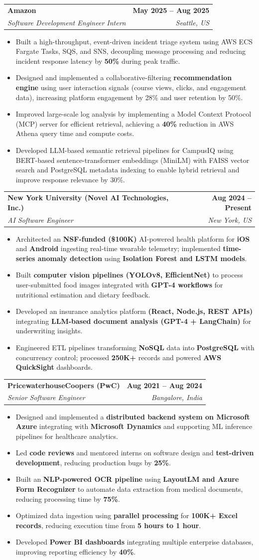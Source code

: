 \documentclass[letterpaper,11pt]{article}
\makeatletter
\newcommand{\resumeItem}[1]{
\item\footnotesize{{#1}\vspace{-4pt}}
}
\newcommand{\resumeSubheading}[4]{
\vspace{2pt}
\item
\begin{tabular*}{1.0\textwidth}[t]{l@{\extracolsep{\fill}}r}
\textbf{\small #1} & \textbf{\scriptsize #2} \\
\textit{\scriptsize #3} & \textit{\scriptsize #4} \\
\end{tabular*}\vspace{-7pt}
}
\newcommand{\resumeItemListStart}{\begin{itemize}[leftmargin=*, itemsep=0pt, topsep=0pt]}
\newcommand{\resumeItemListEnd}{\end{itemize}\vspace{-5pt}}
\makeatother
\begin{document}
\resumeSubheading
{Amazon}{May 2025 -- Aug 2025}
{Software Development Engineer Intern}{Seattle, US}
\resumeItemListStart
\resumeItem{Built a high-throughput, event-driven incident triage system using AWS ECS Fargate Tasks, SQS, and SNS, decoupling message processing and reducing incident response latency by \textbf{50\%} during peak traffic.}
\resumeItem{ Designed and implemented a collaborative-filtering \textbf{recommendation engine} using user interaction signals (course views, clicks, and engagement data), increasing platform engagement by 28\% and user retention by 50\%.}
\resumeItem{Improved large-scale log analysis by implementing a Model Context Protocol (MCP) server for efficient retrieval, achieving a \textbf{40\%} reduction in AWS Athena query time and compute costs.}
\resumeItem{Developed LLM-based semantic retrieval pipelines for CampusIQ using BERT-based sentence-transformer embeddings (MiniLM) with FAISS vector search and PostgreSQL metadata indexing to enable hybrid retrieval and improve response relevance by 30\%.}
\resumeItemListEnd

\resumeSubheading
{New York University (Novel AI Technologies, Inc.)
\href{https://mybeatshealth.com/home}{\faExternalLink}
\href{https://broker.mybeatshealth.com/}{\faExternalLink}}
{Aug 2024 -- Present}
{AI Software Engineer}{New York, US}
\resumeItemListStart
\resumeItem{Architected an \textbf{NSF-funded (\$100K)} AI-powered health platform for \textbf{iOS} and \textbf{Android} ingesting real-time wearable telemetry; implemented \textbf{time-series anomaly detection} using \textbf{Isolation Forest and LSTM models}.}
\resumeItem{Built \textbf{computer vision pipelines (YOLOv8, EfficientNet)} to process user-submitted food images integrated with \textbf{GPT-4 workflows} for nutritional estimation and dietary feedback.}
\resumeItem{Developed an insurance analytics platform \textbf{(React, Node.js, REST APIs)} integrating \textbf{LLM-based document analysis (GPT-4 + LangChain)} for underwriting insights.}
\resumeItem{Engineered ETL pipelines transforming \textbf{NoSQL} data into \textbf{PostgreSQL} with concurrency control; processed \textbf{250K+} records and powered \textbf{AWS QuickSight} dashboards.}
\resumeItemListEnd

\resumeSubheading
{PricewaterhouseCoopers (PwC)}{Aug 2021 -- Aug 2024}
{Senior Software Engineer}{Bangalore, India}
\resumeItemListStart
\resumeItem{Designed and implemented a \textbf{distributed backend system on Microsoft Azure} integrating with \textbf{Microsoft Dynamics} and supporting ML inference pipelines for healthcare analytics.}
\resumeItem{Led \textbf{code reviews} and mentored interns on software design and \textbf{test-driven development}, reducing production bugs by \textbf{25\%}.}
\resumeItem{Built an \textbf{NLP-powered OCR pipeline} using \textbf{LayoutLM and Azure Form Recognizer} to automate data extraction from medical documents, reducing processing time by \textbf{75\%}.}
\resumeItem{Optimized data ingestion using \textbf{parallel processing} for \textbf{100K+ Excel records}, reducing execution time from \textbf{5 hours to 1 hour}.}
\resumeItem{Developed \textbf{Power BI dashboards} integrating multiple enterprise databases, improving reporting efficiency by \textbf{40\%}.}
\resumeItemListEnd
\end{document}
